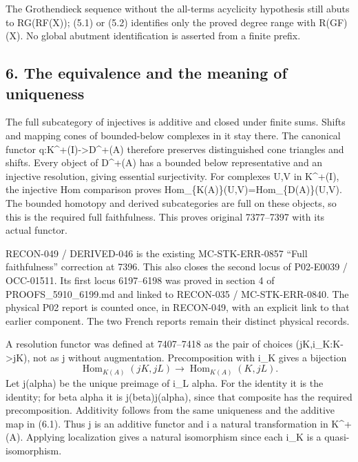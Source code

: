 The Grothendieck sequence without the all-terms acyclicity hypothesis still abuts to RG(RF(X)\allowbreak{})\allowbreak{}; (5.1)\allowbreak{} or (5.2)\allowbreak{} identifies only the proved degree range with R(GF)\allowbreak{}(X)\allowbreak{}. No global abutment identification is asserted from a finite prefix.

\subsection{6. The equivalence and the meaning of uniqueness}\label{proofs-7096-7578-the-equivalence-and-the-meaning-of-uniqueness}

The full subcategory of injectives is additive and closed under finite sums. Shifts and mapping cones of bounded-below complexes in it stay there. The canonical functor q:\allowbreak{}K\textasciicircum{}\allowbreak{}+(I)\allowbreak{}\allowbreak{}->D\textasciicircum{}\allowbreak{}+(A)\allowbreak{} therefore preserves distinguished cone triangles and shifts. Every object of D\textasciicircum{}\allowbreak{}+(A)\allowbreak{} has a bounded below representative and an injective resolution,\allowbreak{} giving essential surjectivity. For complexes U,\allowbreak{}V in K\textasciicircum{}\allowbreak{}+(I)\allowbreak{},\allowbreak{} the injective Hom comparison proves Hom\_\allowbreak{}\{K(A)\allowbreak{}\}(U,\allowbreak{}V)\allowbreak{}\allowbreak{}=Hom\_\allowbreak{}\{D(A)\allowbreak{}\}(U,\allowbreak{}V)\allowbreak{}. The bounded homotopy and derived subcategories are full on these objects,\allowbreak{} so this is the required full faithfulness. This proves original 7377–\allowbreak{}7397 with its actual functor.

RECON-049 /\allowbreak{} DERIVED-046 is the existing MC-STK-ERR-0857 ``Full faithfulness'' correction at 7396. This also closes the second locus of P02-E0039 /\allowbreak{} OCC-01511. Its first locus 6197–\allowbreak{}6198 was proved in section 4 of PROOFS\_\allowbreak{}5910\_\allowbreak{}6199.md and linked to RECON-035 /\allowbreak{} MC-STK-ERR-0840. The physical P02 report is counted once,\allowbreak{} in RECON-049,\allowbreak{} with an explicit link to that earlier component. The two French reports remain their distinct physical records.

A resolution functor was defined at 7407–\allowbreak{}7418 as the pair of choices (jK,\allowbreak{}i\_\allowbreak{}K:\allowbreak{}K\allowbreak{}->jK)\allowbreak{},\allowbreak{} not as j without augmentation. Precomposition with i\_\allowbreak{}K gives a bijection \[
 \operatorname{Hom}_{K(A)}(jK,jL)
       \longrightarrow\operatorname{Hom}_{K(A)}(K,jL).
                                                               \tag{6.1}
\] Let j(alpha)\allowbreak{} be the unique preimage of i\_\allowbreak{}L alpha. For the identity it is the identity; for beta alpha it is j(beta)\allowbreak{}j(alpha)\allowbreak{},\allowbreak{} since that composite has the required precomposition. Additivity follows from the same uniqueness and the additive map in (6.1)\allowbreak{}. Thus j is an additive functor and i a natural transformation in K\textasciicircum{}\allowbreak{}+(A)\allowbreak{}. Applying localization gives a natural isomorphism since each i\_\allowbreak{}K is a quasi-isomorphism.

